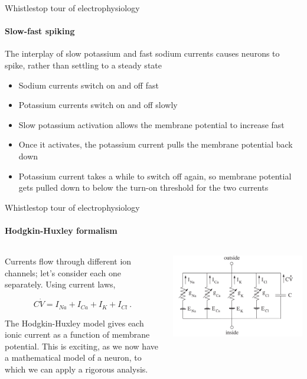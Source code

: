 \documentclass[aspectratio=169]{beamer}
\begin{document}
\begin{frame}[label={sec:org9d26e4a}]{Whistlestop tour of electrophysiology}
\framesubtitle{Slow-fast spiking}

The interplay of slow potassium and fast sodium currents causes neurons to spike, rather than settling to a steady state

\begin{itemize}[<+->]
\item Sodium currents switch on and off fast
\item Potassium currents switch on and off slowly
\item Slow potassium activation allows the membrane potential to increase fast
\item Once it activates, the potassium current pulls the membrane potential back down
\item Potassium current takes a while to switch off again, so membrane potential gets pulled down to below the turn-on threshold for the two currents
\end{itemize}
\end{frame}


\begin{frame}[label={sec:orga71ab97}]{Whistlestop tour of electrophysiology}
\framesubtitle{Hodgkin-Huxley formalism}

\begin{columns}
\begin{column}{0.5\columnwidth}
Currents flow through different ion channels; let's consider each one separately.
Using current laws,

\begin{equation}
    C\dot{V} = I_{Na} + I_{Ca} + I_{K} + I_{Cl}~.
\end{equation}

The Hodgkin-Huxley model gives each ionic current as a function of membrane potential.
This is exciting, as we now have a mathematical model of a neuron, to which we can apply a rigorous analysis.
\end{column}

\begin{column}{0.5\columnwidth}
\begin{center}
\includegraphics[width=.9\linewidth]{./neuroncircuit.png}
\end{center}
\end{column}
\end{columns}
\end{frame}
\end{document}
